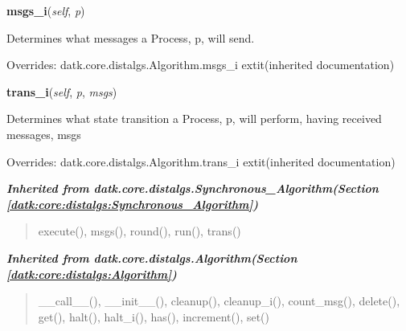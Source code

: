     \vspace{0.5ex}

\hspace{.8\funcindent}\begin{boxedminipage}{\funcwidth}

    \raggedright \textbf{msgs\_i}(\textit{self}, \textit{p})

\setlength{\parskip}{2ex}
    Determines what messages a Process, p, will send.

\setlength{\parskip}{1ex}
      Overrides: datk.core.distalgs.Algorithm.msgs\_i 	extit{(inherited documentation)}

    \end{boxedminipage}

    \vspace{0.5ex}

\hspace{.8\funcindent}\begin{boxedminipage}{\funcwidth}

    \raggedright \textbf{trans\_i}(\textit{self}, \textit{p}, \textit{msgs})

\setlength{\parskip}{2ex}
    Determines what state transition a Process, p, will perform, having 
    received messages, msgs

\setlength{\parskip}{1ex}
      Overrides: datk.core.distalgs.Algorithm.trans\_i 	extit{(inherited documentation)}

    \end{boxedminipage}


\large{\textbf{\textit{Inherited from datk.core.distalgs.Synchronous\_Algorithm\textit{(Section \ref{datk:core:distalgs:Synchronous_Algorithm})}}}}

\begin{quote}
execute(), msgs(), round(), run(), trans()
\end{quote}

\large{\textbf{\textit{Inherited from datk.core.distalgs.Algorithm\textit{(Section \ref{datk:core:distalgs:Algorithm})}}}}

\begin{quote}
\_\_call\_\_(), \_\_init\_\_(), cleanup(), cleanup\_i(), count\_msg(), delete(), get(), halt(), halt\_i(), has(), increment(), set()
\end{quote}
